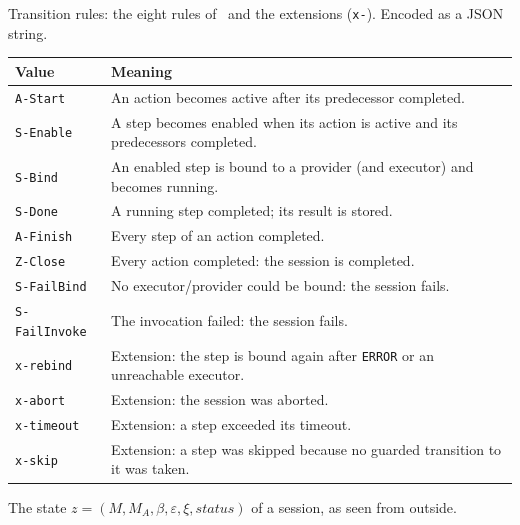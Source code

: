 \documentclass[a4paper]{arrowhead}
\begin{document}
Transition rules: the eight rules of~\cite{varga2026} and the extensions (\texttt{x-}).
 Encoded as a JSON string.
{\small
\begin{longtable}{|p{3.9cm}|p{11.9cm}|}

\hline
\rowcolor{gray!33} Value & Meaning \\ \hline
\endhead
\texttt{A-Start} & An action becomes active after its predecessor completed. \\ \hline
\texttt{S-Enable} & A step becomes enabled when its action is active and its predecessors completed. \\ \hline
\texttt{S-Bind} & An enabled step is bound to a provider (and executor) and becomes running. \\ \hline
\texttt{S-Done} & A running step completed; its result is stored. \\ \hline
\texttt{A-Finish} & Every step of an action completed. \\ \hline
\texttt{Z-Close} & Every action completed: the session is completed. \\ \hline
\texttt{S-FailBind} & No executor/provider could be bound: the session fails. \\ \hline
\texttt{S-FailInvoke} & The invocation failed: the session fails. \\ \hline
\texttt{x-rebind} & Extension: the step is bound again after \texttt{ERROR} or an unreachable executor. \\ \hline
\texttt{x-abort} & Extension: the session was aborted. \\ \hline
\texttt{x-timeout} & Extension: a step exceeded its timeout. \\ \hline
\texttt{x-skip} & Extension: a step was skipped because no guarded transition to it was taken. \\ \hline
\end{longtable}
}

The state $z = (M, M_A, \beta, \varepsilon, \xi, status)$ of a session, as seen from outside.
\end{document}
